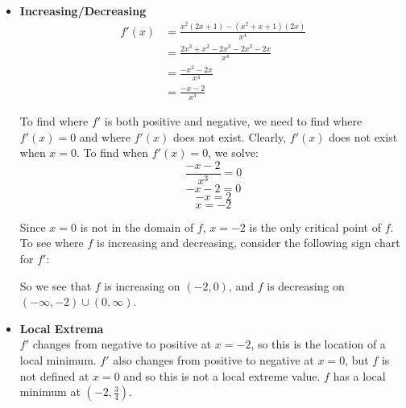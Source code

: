 \documentclass[nooutcomes]{ximera}
\newcommand{\dfn}{\textbf}
\renewenvironment{freeResponse}{
\ifhandout\setbox0\vbox\bgroup\else
\begin{trivlist}\item[\hskip \labelsep\bfseries Solution:\hspace{2ex}]
\fi}
{\ifhandout\egroup\else
\end{trivlist}
\fi}
\begin{document}
\begin{problem}
\begin{freeResponse}
\begin{itemize}
			
			
			\item  \dfn{Increasing/Decreasing}  \\
			
			\begin{align*}
			f'(x) &= \frac{x^2(2x+1) - (x^2+x+1)(2x)}{x^4} \\
			&= \frac{2x^3 + x^2 - 2x^3 - 2x^2 - 2x}{x^4} \\
			&= \frac{-x^2 - 2x}{x^4} \\
			&= \frac{-x-2}{x^3}
			\end{align*}
			
			To find where $f'$ is both positive and negative, we need to find where $f'(x) = 0$ and where $f'(x)$ does not exist.  Clearly, $f'(x)$ does not exist when $x=0$.  To find when $f'(x) = 0$, we solve:
			$$ \frac{-x-2}{x^3} = 0 $$
			$$ -x-2 = 0 $$
			$$ -x = 2 $$
			$$ x = -2 $$
			
			Since $x=0$ is not in the domain of $f$, $x=-2$ is the only critical point of $f$.  To see where $f$ is increasing and decreasing, consider the following sign chart for $f'$:
			
		
\begin{center}
\begin{image}
\end{image}
\end{center}


So we see that $f$ is increasing on $(-2,0)$, and $f$ is decreasing on $(-\infty, -2) \cup (0,\infty)$.

			
			
			
			\item  \dfn{Local Extrema}  \\
			$f'$ changes from negative to positive at $x=-2$, so this is the location of a local minimum.  $f'$ also changes from positive to negative at $x=0$, but $f$ is not defined at $x=0$ and so this is not a local extreme value. $f$ has a local minimum at $\left( -2,\frac{3}{4} \right)$.
			

\end{itemize}
\end{freeResponse}
\end{problem}
\end{document}
